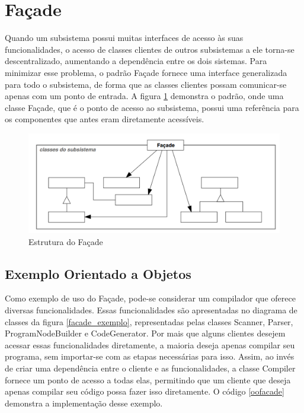 \section{Façade}

Quando um subsistema possui muitas interfaces 
de acesso às suas funcionalidades, o acesso de 
classes clientes de outros subsistemas a ele 
torna-se descentralizado, aumentando a dependência 
entre os dois sistemas. Para minimizar esse problema, 
o padrão Façade fornece uma interface generalizada 
para todo o subsistema, de forma que as classes 
clientes possam comunicar-se apenas com um ponto 
de entrada. A figura \ref{facade_struct} demonstra 
o padrão, onde uma classe Façade, que é o ponto de 
acesso ao subsistema, possui uma referência para 
os componentes que antes eram diretamente acessíveis.

\begin{figure}[htb]
	\caption{\label{facade_struct}Estrutura do Façade}
	\begin{center}
	    \includegraphics[scale=0.4]{5_padroes-contexto-funcional/5.2_estruturais/5.2.5_facade/diagram.png}
	\end{center}
\end{figure}

\subsection*{Exemplo Orientado a Objetos}

Como exemplo de uso do Façade, pode-se considerar 
um compilador que oferece diversas funcionalidades. 
Essas funcionalidades são apresentadas no diagrama 
de classes da figura \ref{facade_exemplo}, representadas 
pelas classes Scanner, Parser, ProgramNodeBuilder e 
CodeGenerator. Por mais que alguns clientes desejem 
acessar essas funcionalidades diretamente, a maioria 
deseja apenas compilar seu programa, sem importar-se 
com as etapas necessárias para isso. Assim, ao invés de 
criar uma dependência entre o cliente e as 
funcionalidades, a classe Compiler fornece um ponto 
de acesso a todas elas, permitindo que um cliente 
que deseja apenas compilar seu código possa fazer 
isso diretamente. O código \ref{oofacade} demonstra 
a implementação desse exemplo.

